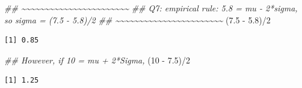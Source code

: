 \documentclass[
  letterpaper,
  DIV=11,
  numbers=noendperiod,
  oneside]{scrreprt}
\newenvironment{Shaded}{\begin{snugshade}}{\end{snugshade}}
\newcommand{\DecValTok}[1]{\textcolor[rgb]{0.68,0.00,0.00}{#1}}
\newcommand{\DocumentationTok}[1]{\textcolor[rgb]{0.37,0.37,0.37}{\textit{#1}}}
\newcommand{\FloatTok}[1]{\textcolor[rgb]{0.68,0.00,0.00}{#1}}
\newcommand{\NormalTok}[1]{\textcolor[rgb]{0.00,0.23,0.31}{#1}}
\newcommand{\SpecialCharTok}[1]{\textcolor[rgb]{0.37,0.37,0.37}{#1}}
\begin{document}
\begin{Shaded}
\begin{Highlighting}[]
\DocumentationTok{\#\# \textasciitilde{}\textasciitilde{}\textasciitilde{}\textasciitilde{}\textasciitilde{}\textasciitilde{}\textasciitilde{}\textasciitilde{}\textasciitilde{}\textasciitilde{}\textasciitilde{}\textasciitilde{}\textasciitilde{}\textasciitilde{}\textasciitilde{}\textasciitilde{}\textasciitilde{}\textasciitilde{}\textasciitilde{}\textasciitilde{}\textasciitilde{}\textasciitilde{}\textasciitilde{}}
\DocumentationTok{\#\# Q7: empirical rule: 5.8 = mu {-} 2*sigma, so sigma = (7.5 {-} 5.8)/2}
\DocumentationTok{\#\# \textasciitilde{}\textasciitilde{}\textasciitilde{}\textasciitilde{}\textasciitilde{}\textasciitilde{}\textasciitilde{}\textasciitilde{}\textasciitilde{}\textasciitilde{}\textasciitilde{}\textasciitilde{}\textasciitilde{}\textasciitilde{}\textasciitilde{}\textasciitilde{}\textasciitilde{}\textasciitilde{}\textasciitilde{}\textasciitilde{}\textasciitilde{}\textasciitilde{}\textasciitilde{}}
\NormalTok{(}\FloatTok{7.5} \SpecialCharTok{{-}} \FloatTok{5.8}\NormalTok{)}\SpecialCharTok{/}\DecValTok{2}
\end{Highlighting}
\end{Shaded}

\begin{verbatim}
[1] 0.85
\end{verbatim}

\begin{Shaded}
\begin{Highlighting}[]
\DocumentationTok{\#\# However, if 10 = mu + 2*Sigma,}
\NormalTok{(}\DecValTok{10} \SpecialCharTok{{-}} \FloatTok{7.5}\NormalTok{)}\SpecialCharTok{/}\DecValTok{2}
\end{Highlighting}
\end{Shaded}

\begin{verbatim}
[1] 1.25
\end{verbatim}
\end{document}
